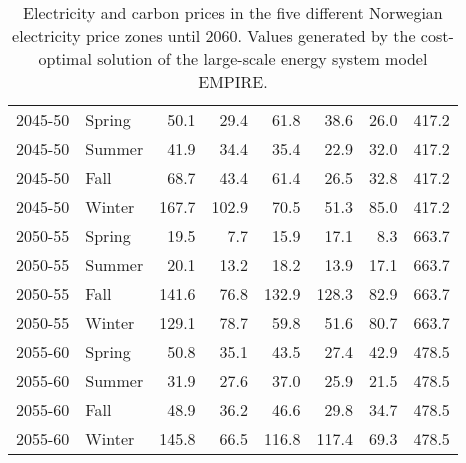 \begin{table}[h]
{\begin{tabular}{llrrrrrr}
			2045-50 & Spring & 50.1 & 29.4  & 61.8 & 38.6 & 26.0 & 417.2\\
			2045-50 & Summer & 41.9 & 34.4  & 35.4 & 22.9 & 32.0 & 417.2\\
			2045-50 & Fall & 68.7 & 43.4  & 61.4 & 26.5 & 32.8 & 417.2\\
			2045-50 & Winter & 167.7 & 102.9  & 70.5 & 51.3 & 85.0 & 417.2\\\hline
			
			2050-55 & Spring & 19.5 & 7.7  & 15.9 & 17.1 & 8.3 & 663.7\\
			2050-55 & Summer & 20.1 & 13.2  & 18.2 & 13.9 & 17.1 & 663.7\\
			2050-55 & Fall & 141.6 & 76.8  & 132.9 & 128.3 & 82.9 & 663.7\\
			2050-55 & Winter & 129.1 & 78.7  & 59.8 & 51.6 & 80.7 & 663.7\\\hline
			
			2055-60 & Spring & 50.8 & 35.1  & 43.5 & 27.4 & 42.9 & 478.5\\
			2055-60 & Summer & 31.9 & 27.6  & 37.0 & 25.9 & 21.5 & 478.5\\
			2055-60 & Fall & 48.9 & 36.2  & 46.6 & 29.8 & 34.7 & 478.5\\
			2055-60 & Winter & 145.8 & 66.5  & 116.8 & 117.4 & 69.3 & 478.5\\

			\bottomrule
	\end{tabular}}
	\caption{Electricity and carbon prices in the five different Norwegian electricity price zones until 2060. Values generated by the cost-optimal solution of the large-scale energy system model EMPIRE.}
	\label{tab:prices}
\end{table}

